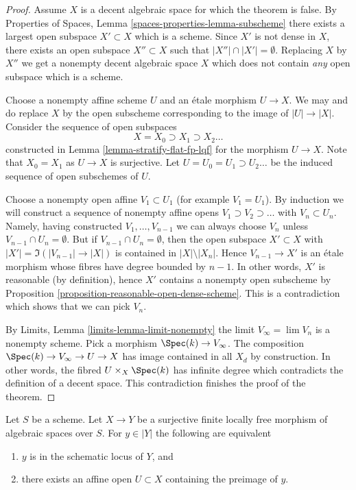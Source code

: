 \begin{proof}
Assume $X$ is a decent algebraic space for which the theorem is false. By
Properties of Spaces, Lemma \ref{spaces-properties-lemma-subscheme}
there exists a largest open subspace $X' \subset X$ which is a scheme.
Since $X'$ is not dense in $X$, there exists an open subspace
$X'' \subset X$ such that $|X''| \cap |X'| = \emptyset$. Replacing $X$
by $X''$ we get a nonempty decent algebraic space $X$ which does not
contain {\it any} open subspace which is a scheme.

\medskip\noindent
Choose a nonempty affine scheme $U$ and an \'etale morphism $U \to X$.
We may and do replace $X$ by the open subscheme corresponding to the
image of $|U| \to |X|$. Consider the sequence of open subspaces
$$
X = X_0 \supset X_1 \supset X_2 \ldots
$$
constructed in Lemma \ref{lemma-stratify-flat-fp-lqf}
for the morphism $U \to X$. Note that $X_0 = X_1$ as $U \to X$
is surjective. Let $U = U_0 = U_1 \supset U_2 \ldots$ be the induced
sequence of open subschemes of $U$.

\medskip\noindent
Choose a nonempty open affine $V_1 \subset U_1$ (for example $V_1 = U_1$).
By induction we will construct a sequence of nonempty affine opens
$V_1 \supset V_2 \supset \ldots$ with $V_n \subset U_n$. Namely, having
constructed $V_1, \ldots, V_{n - 1}$ we can always choose $V_n$ unless
$V_{n - 1} \cap U_n = \emptyset$. But if $V_{n - 1} \cap U_n = \emptyset$,
then the open subspace $X' \subset X$ with
$|X'| = \Im(|V_{n - 1}| \to |X|)$ is contained in $|X| \setminus |X_n|$.
Hence $V_{n - 1} \to X'$ is an \'etale morphism whose fibres have degree
bounded by $n - 1$. In other words, $X'$ is reasonable (by definition),
hence $X'$ contains a nonempty open subscheme by
Proposition \ref{proposition-reasonable-open-dense-scheme}.
This is a contradiction which shows that we can pick $V_n$.

\medskip\noindent
By Limits, Lemma \ref{limits-lemma-limit-nonempty}
the limit $V_\infty = \lim V_n$ is a nonempty scheme. Pick a morphism
$\Spec(k) \to V_\infty$. The composition $\Spec(k) \to V_\infty \to U \to X$
has image contained in all $X_d$ by construction. In other words, the
fibred $U \times_X \Spec(k)$ has infinite degree which contradicts
the definition of a decent space. This contradiction finishes the proof
of the theorem.
\end{proof}

\begin{lemma}
\label{lemma-when-quotient-scheme-at-point}
Let $S$ be a scheme. Let $X \to Y$ be a surjective finite locally free
morphism of algebraic spaces over $S$. For $y \in |Y|$ the following are
equivalent
\begin{enumerate}
\item $y$ is in the schematic locus of $Y$, and
\item there exists an affine open $U \subset X$
containing the preimage of $y$.
\end{enumerate}
\end{lemma}

